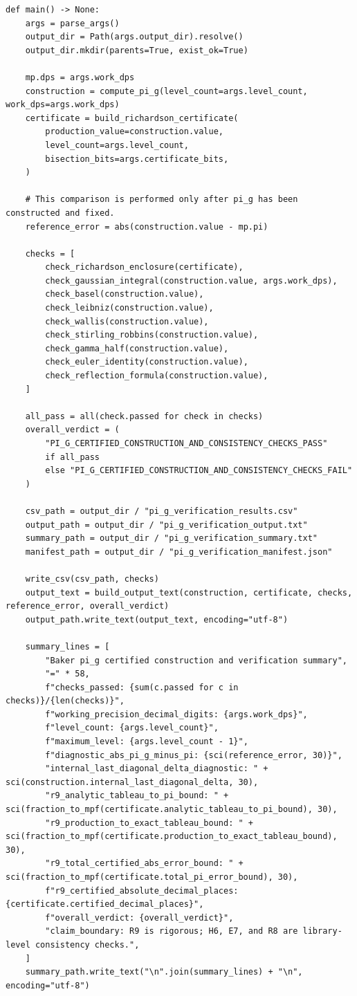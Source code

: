 \documentclass[11pt]{article}
\begin{document}
\begin{lstlisting}[style=pythonstyle,caption={Verification driver: \texttt{verify\_pi\_g\_identities.py}}]
def main() -> None:
    args = parse_args()
    output_dir = Path(args.output_dir).resolve()
    output_dir.mkdir(parents=True, exist_ok=True)

    mp.dps = args.work_dps
    construction = compute_pi_g(level_count=args.level_count, work_dps=args.work_dps)
    certificate = build_richardson_certificate(
        production_value=construction.value,
        level_count=args.level_count,
        bisection_bits=args.certificate_bits,
    )

    # This comparison is performed only after pi_g has been constructed and fixed.
    reference_error = abs(construction.value - mp.pi)

    checks = [
        check_richardson_enclosure(certificate),
        check_gaussian_integral(construction.value, args.work_dps),
        check_basel(construction.value),
        check_leibniz(construction.value),
        check_wallis(construction.value),
        check_stirling_robbins(construction.value),
        check_gamma_half(construction.value),
        check_euler_identity(construction.value),
        check_reflection_formula(construction.value),
    ]

    all_pass = all(check.passed for check in checks)
    overall_verdict = (
        "PI_G_CERTIFIED_CONSTRUCTION_AND_CONSISTENCY_CHECKS_PASS"
        if all_pass
        else "PI_G_CERTIFIED_CONSTRUCTION_AND_CONSISTENCY_CHECKS_FAIL"
    )

    csv_path = output_dir / "pi_g_verification_results.csv"
    output_path = output_dir / "pi_g_verification_output.txt"
    summary_path = output_dir / "pi_g_verification_summary.txt"
    manifest_path = output_dir / "pi_g_verification_manifest.json"

    write_csv(csv_path, checks)
    output_text = build_output_text(construction, certificate, checks, reference_error, overall_verdict)
    output_path.write_text(output_text, encoding="utf-8")

    summary_lines = [
        "Baker pi_g certified construction and verification summary",
        "=" * 58,
        f"checks_passed: {sum(c.passed for c in checks)}/{len(checks)}",
        f"working_precision_decimal_digits: {args.work_dps}",
        f"level_count: {args.level_count}",
        f"maximum_level: {args.level_count - 1}",
        f"diagnostic_abs_pi_g_minus_pi: {sci(reference_error, 30)}",
        "internal_last_diagonal_delta_diagnostic: " + sci(construction.internal_last_diagonal_delta, 30),
        "r9_analytic_tableau_to_pi_bound: " + sci(fraction_to_mpf(certificate.analytic_tableau_to_pi_bound), 30),
        "r9_production_to_exact_tableau_bound: " + sci(fraction_to_mpf(certificate.production_to_exact_tableau_bound), 30),
        "r9_total_certified_abs_error_bound: " + sci(fraction_to_mpf(certificate.total_pi_error_bound), 30),
        f"r9_certified_absolute_decimal_places: {certificate.certified_decimal_places}",
        f"overall_verdict: {overall_verdict}",
        "claim_boundary: R9 is rigorous; H6, E7, and R8 are library-level consistency checks.",
    ]
    summary_path.write_text("\n".join(summary_lines) + "\n", encoding="utf-8")


\end{lstlisting}
\end{document}
